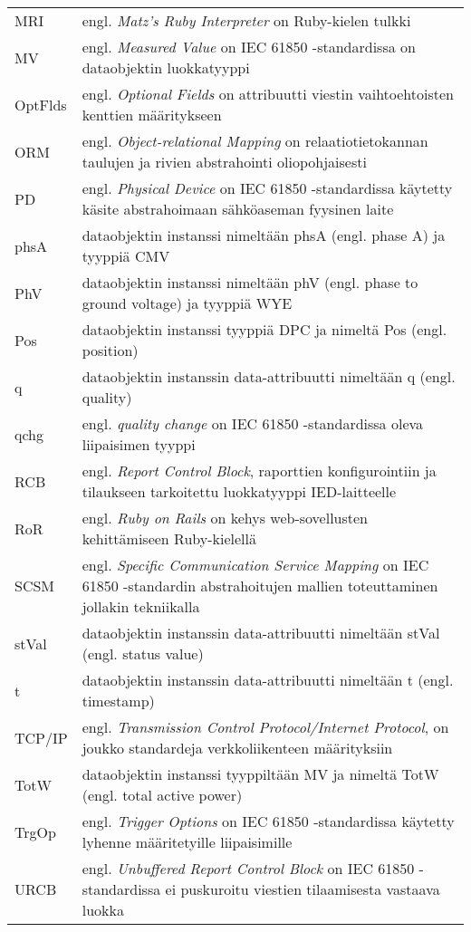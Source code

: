 \begin{tabularx}{\linewidth}[h]{@{} p{} p{} @{}}
	MRI & engl. \emph{Matz’s Ruby Interpreter} on Ruby-kielen tulkki \\
	MV & engl. \emph{Measured Value} on IEC 61850 -standardissa on dataobjektin luokkatyyppi \\
	OptFlds & engl. \emph{Optional Fields} on attribuutti viestin vaihtoehtoisten kenttien määritykseen \\
	ORM & engl. \emph{Object-relational Mapping} on relaatiotietokannan taulujen ja rivien abstrahointi oliopohjaisesti \\
	PD & engl. \emph{Physical Device} on IEC 61850 -standardissa käytetty käsite abstrahoimaan sähköaseman fyysinen laite \\
	phsA & dataobjektin instanssi nimeltään phsA (engl. phase A) ja tyyppiä CMV \\
	PhV & dataobjektin instanssi nimeltään phV (engl. phase to ground voltage) ja tyyppiä WYE \\
	Pos & dataobjektin instanssi tyyppiä DPC ja nimeltä Pos (engl. position) \\
	q & dataobjektin instanssin data-attribuutti nimeltään q (engl. quality) \\
	qchg & engl. \emph{quality change} on IEC 61850 -standardissa oleva liipaisimen tyyppi \\
	RCB & engl. \emph{Report Control Block}, raporttien konfigurointiin ja tilaukseen tarkoitettu luokkatyyppi IED-laitteelle \\
	RoR & engl. \emph{Ruby on Rails} on kehys web-sovellusten kehittämiseen Ruby-kielellä \\
	SCSM & engl. \emph{Specific Communication Service Mapping} on IEC 61850 -standardin abstrahoitujen mallien toteuttaminen jollakin tekniikalla \\
	stVal & dataobjektin instanssin data-attribuutti nimeltään stVal (engl. status value) \\
	t & dataobjektin instanssin data-attribuutti nimeltään t (engl. timestamp) \\
	TCP/IP & engl. \emph{Transmission Control Protocol/Internet Protocol}, on joukko standardeja verkkoliikenteen määrityksiin \\
	TotW & dataobjektin instanssi tyyppiltään MV ja nimeltä TotW (engl. total active power) \\
	TrgOp & engl. \emph{Trigger Options} on IEC 61850 -standardissa käytetty lyhenne määritetyille liipaisimille \\
	URCB & engl. \emph{Unbuffered Report Control Block} on IEC 61850 -standardissa ei puskuroitu viestien tilaamisesta vastaava luokka \\

\end{tabularx}
